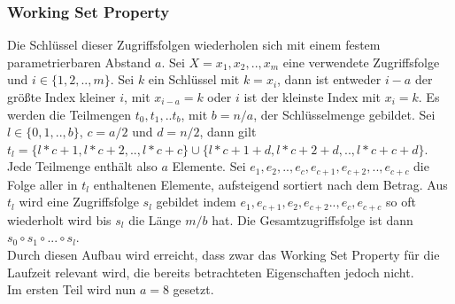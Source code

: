 \documentclass[a4paper,12pt]{article}
\begin{document}
\subsubsection{Working Set Property} \label{testWork}
Die Schlüssel dieser Zugriffsfolgen wiederholen sich mit einem festem parametrierbaren Abstand $a$. 
Sei  $X = x_1, x_2,.., x_m$ eine verwendete Zugriffsfolge und $i \in \{1,2,..,m\}$. Sei $k$ ein Schlüssel mit $k = x_i$, dann ist entweder $i-a$ der größte Index kleiner $i$, mit $x_{i-a} = k$ oder $i$ ist der kleinste Index mit $x_i = k$. Es werden die Teilmengen $t_0, t_1,.. t_b$, mit $b = n / a$, der  Schlüsselmenge gebildet. Sei $l \in \{0, 1,.., b\}$, $c = a/2$ und $d = n /2$, dann gilt \\ $t_l = \{l * c + 1, l * c + 2,.., l * c + c\} \cup \{l * c + 1 + d, l * c + 2 + d,.., l * c + c + d\}$. Jede Teilmenge enthält also $a$ Elemente. Sei $e_1, e_2,.., e_c, e_{c+1}, e_{c+2},.., e_{c+c} $ die Folge aller in $t_l$ enthaltenen Elemente, aufsteigend sortiert nach dem Betrag. Aus $t_l$ wird eine Zugriffsfolge $s_l$ gebildet indem  $e_1, e_{c+1}, e_2,e_{c+2}.., e_c, e_{c + c}$ so oft wiederholt wird bis $s_l$ die Länge $m/b$ hat. Die Gesamtzugriffsfolge ist dann $s_0 \circ s_1 \circ...\circ s_l$. \\
Durch diesen Aufbau wird erreicht, dass zwar das Working Set Property für die Laufzeit relevant wird, die bereits betrachteten Eigenschaften jedoch nicht.\\
Im ersten Teil wird nun $a = 8$ gesetzt.
\end{document}
